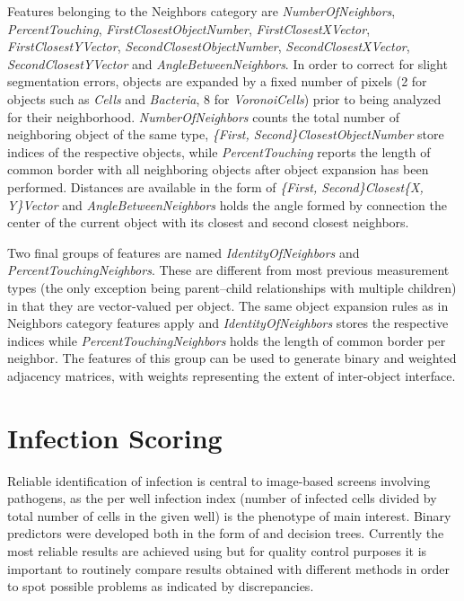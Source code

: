 Features belonging to the Neighbors category are \textit{NumberOfNeighbors}, \textit{PercentTouching}, \textit{FirstClosestObjectNumber}, \textit{FirstClosestXVector}, \textit{FirstClosestYVector}, \textit{SecondClosestObjectNumber}, \textit{SecondClosestXVector}, \textit{SecondClosestYVector} and \textit{AngleBetweenNeighbors}. In order to correct for slight segmentation errors, objects are expanded by a fixed number of pixels (2 for objects such as \textit{Cells} and \textit{Bacteria}, 8 for \textit{VoronoiCells}) prior to being analyzed for their neighborhood. \textit{NumberOfNeighbors} counts the total number of neighboring object of the same type, \textit{\{First, Second\}ClosestObjectNumber} store indices of the respective objects, while \textit{PercentTouching} reports the length of common border with all neighboring objects after object expansion has been performed. Distances are available in the form of \textit{\{First, Second\}Closest\{X, Y\}Vector} and \textit{AngleBetweenNeighbors} holds the angle formed by connection the center of the current object with its closest and second closest neighbors.

Two final groups of features are named \textit{IdentityOfNeighbors} and \textit{PercentTouchingNeighbors}. These are different from most previous measurement types (the only exception being parent--child relationships with multiple children) in that they are vector-valued per object. The same object expansion rules as in Neighbors category features apply and \textit{IdentityOfNeighbors} stores the respective indices while \textit{PercentTouchingNeighbors} holds the length of common border per neighbor. The features of this group can be used to generate binary and weighted adjacency matrices, with weights representing the extent of inter-object interface.

\section{Infection Scoring}
\label{sec:infection-scoring}
Reliable identification of infection is central to image-based  screens involving pathogens, as the per well infection index (number of infected cells divided by total number of cells in the given well) is the phenotype of main interest. Binary predictors were developed both in the form of  and decision trees. Currently the most reliable results are achieved using  but for quality control purposes it is important to routinely compare results obtained with different methods in order to spot possible problems as indicated by discrepancies.

